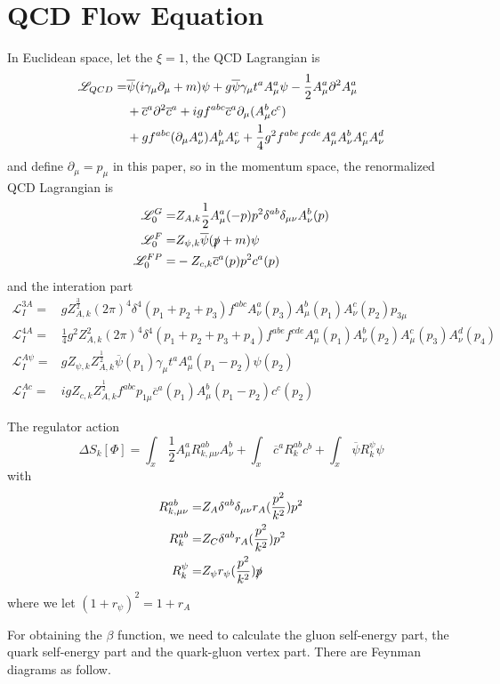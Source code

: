 \documentclass[UTF8]{ctexart}
\begin{document}
\section{QCD Flow Equation}
In Euclidean space, let the $\xi=1$, the QCD Lagrangian is
\begin{align}
\mathscr{L}_{QCD}=&\overline{\psi}(i\gamma_{\mu}\partial_{\mu}+m)\psi+g\overline{\psi}{\gamma_{\mu}}t^{a}{A^{a}_{\mu}}\psi-{\frac{1}{2}}A_{\mu}^{a}{\partial}^{2}A_{\mu}^{a}\notag\\&+{\overline{c}}^{a}{\partial}^{2}{\overline{c}}^{a}+ig{f}^{abc}{\overline{c}}^{a}\partial_{\mu}({A^{b}_{\mu}}c^c)\notag\\&+g{f}^{abc}(\partial_{\mu}A^{a}_{\nu})A^{b}_{\mu}A^{c}_{\nu}+{\frac{1}{4}}g^{2}f^{abe}f^{cde}A^{a}_{\mu}A^{b}_{\nu}A^{c}_{\mu}A^{d}_{\nu}
\end{align}
and define $\partial_{\mu}=p_{\mu}$ in this paper, so in the momentum space, the renormalized QCD Lagrangian is
\begin{align}
\mathscr{L}_{0}^{G}=&Z_{A,k}{\frac{1}{2}}A_{\mu}^{a}(-p)p^{2}\delta^{ab}\delta_{\mu\nu}A_{\nu}^{b}(p)
\\\mathscr{L}_{0}^{F}=&Z_{\psi,k}\overline{\psi}(\slashed{p}+m)\psi
\\\mathscr{L}_{0}^{FP}=&-Z_{c,k}{\overline{c}}^{a}(p)p^{2}c^{a}(p)
\end{align}
and the interation part
\begin{align}
\mathscr{L}_{I}^{3A}=&gZ_{A,k}^{\frac{3}{2}}{(2\pi)}^{4}{\delta}^{4}(p_1+p_2+p_3)f^{abc}A_{\nu}^{a}(p_3)A_{\mu}^{b}(p_1)A_{\nu}^{c}(p_2)p_{3\mu}
\\\mathscr{L}_{I}^{4A}=&{\frac{1}{4}}g^{2}Z_{A,k}^{2}{(2\pi)}^{4}{\delta}^{4}(p_1+p_2+p_3+p_4)f^{abe}f^{cde}A_{\mu}^{a}(p_1)A_{\nu}^{b}(p_2)A_{\mu}^{c}(p_3)A_{\nu}^{d}(p_4)
\\\mathscr{L}_{I}^{A\psi}=&gZ_{\psi,k}Z_{A,k}^{\frac{1}{2}}\overline{\psi}(p_1)\gamma_{\mu}t^{a}A_{\mu}^{a}(p_1-p_2)\psi(p_2)
\\\mathscr{L}_{I}^{Ac}=&igZ_{c,k}Z_{A,k}^{\frac{1}{2}}f^{abc}p_{1\mu}{\overline{c}}^{a}(p_1)A_{\mu}^{b}(p_1-p_2)c^{c}(p_2)
\end{align}
\par The regulator action
\begin{equation}
{\Delta}S_{k}[\Phi]=\int_{x}\,\frac{1}{2}A_{\mu}^{a}R_{k,\mu\nu}^{ab}A_{\nu}^{b}+\int_{x}\,{\overline{c}}^{a}R_{k}^{ab}c^{b}+\int_{x}\,\overline{\psi}R_{k}^{\psi}\psi
\end{equation}
with
\begin{align}
R_{k,\mu\nu}^{ab}=&Z_{A}\delta^{ab}\delta_{\mu\nu}r_{A}(\frac{p^2}{k^2})p^2
\\R_{k}^{ab}=&Z_{C}\delta^{ab}r_{A}(\frac{p^2}{k^2})p^2
\\R_{k}^{\psi}=&Z_{\psi}r_{\psi}(\frac{p^2}{k^2})\slashed{p}
\end{align}
where we let ${(1+r_{\psi})}^{2}=1+r_A$
\par For obtaining the $\beta$ function, we need to calculate the gluon self-energy part, the quark self-energy part and the quark-gluon vertex part. There are Feynman diagrams as follow.
\end{document}

